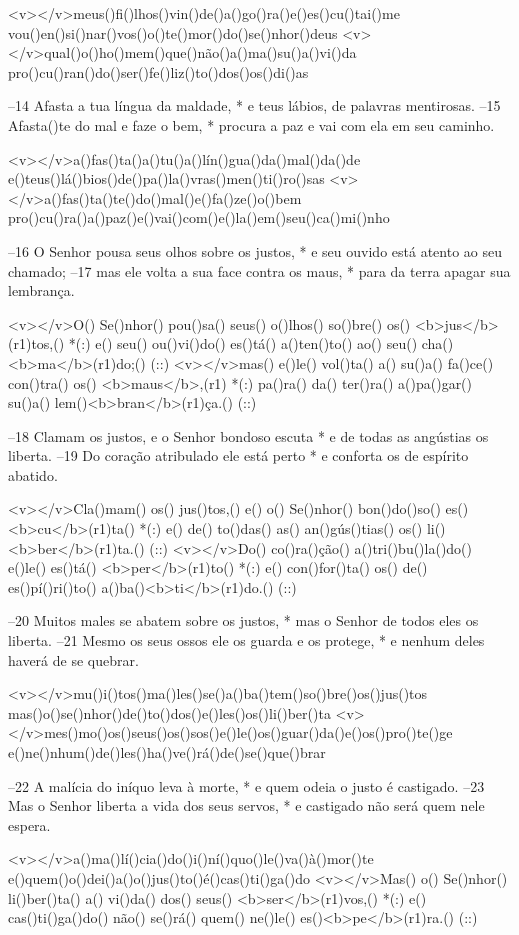 <v></v>meus()fi()lhos()vin()de()a()go()ra()e()es()cu()tai()me
vou()en()si()nar()vos()o()te()mor()do()se()nhor()deus
<v></v>qual()o()ho()mem()que()não()a()ma()su()a()vi()da
pro()cu()ran()do()ser()fe()liz()to()dos()os()di()as

–14 Afasta a tua língua da maldade, *
e teus lábios, de palavras mentirosas.
–15 Afasta()te do mal e faze o bem, *
procura a paz e vai com ela em seu caminho.

<v></v>a()fas()ta()a()tu()a()lín()gua()da()mal()da()de
e()teus()lá()bios()de()pa()la()vras()men()ti()ro()sas
<v></v>a()fas()ta()te()do()mal()e()fa()ze()o()bem
pro()cu()ra()a()paz()e()vai()com()e()la()em()seu()ca()mi()nho

–16 O Senhor pousa seus olhos sobre os justos, *
e seu ouvido está atento ao seu chamado;
–17 mas ele volta a sua face contra os maus, *
para da terra apagar sua lembrança.

<v></v>O() Se()nhor() pou()sa() seus() o()lhos() so()bre() os() <b>jus</b>(r1)tos,() *(:)
e() seu() ou()vi()do() es()tá() a()ten()to() ao() seu() cha()<b>ma</b>(r1)do;() (::)
<v></v>mas() e()le() vol()ta() a() su()a() fa()ce() con()tra() os() <b>maus</b>,(r1) *(:)
pa()ra() da() ter()ra() a()pa()gar() su()a() lem()<b>bran</b>(r1)ça.() (::)

–18 Clamam os justos, e o Senhor bondoso escuta *
e de todas as angústias os liberta.
–19 Do coração atribulado ele está perto *
e conforta os de espírito abatido.

<v></v>Cla()mam() os() jus()tos,() e() o() Se()nhor() bon()do()so() es()<b>cu</b>(r1)ta() *(:)
e() de() to()das() as() an()gús()tias() os() li()<b>ber</b>(r1)ta.() (::)
<v></v>Do() co()ra()ção() a()tri()bu()la()do() e()le() es()tá() <b>per</b>(r1)to() *(:)
e() con()for()ta() os() de() es()pí()ri()to() a()ba()<b>ti</b>(r1)do.() (::)

–20 Muitos males se abatem sobre os justos, *
mas o Senhor de todos eles os liberta.
–21 Mesmo os seus ossos ele os guarda e os protege, *
e nenhum deles haverá de se quebrar.

<v></v>mu()i()tos()ma()les()se()a()ba()tem()so()bre()os()jus()tos
mas()o()se()nhor()de()to()dos()e()les()os()li()ber()ta
<v></v>mes()mo()os()seus()os()sos()e()le()os()guar()da()e()os()pro()te()ge
e()ne()nhum()de()les()ha()ve()rá()de()se()que()brar

–22 A malícia do iníquo leva à morte, *
e quem odeia o justo é castigado.
–23 Mas o Senhor liberta a vida dos seus servos, *
e castigado não será quem nele espera.

<v></v>a()ma()lí()cia()do()i()ní()quo()le()va()à()mor()te
e()quem()o()dei()a()o()jus()to()é()cas()ti()ga()do
<v></v>Mas() o() Se()nhor() li()ber()ta() a() vi()da() dos() seus() <b>ser</b>(r1)vos,() *(:)
e() cas()ti()ga()do() não() se()rá() quem() ne()le() es()<b>pe</b>(r1)ra.() (::)